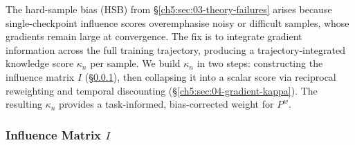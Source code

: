 \begin{foldable} %
	The hard-sample bias (HSB) from \S\ref{ch5:sec:03-theory-failures} arises because single-checkpoint influence scores overemphasise noisy or difficult samples, whose gradients remain large at convergence.
    The fix is to integrate gradient information across the full training trajectory, producing a trajectory-integrated knowledge score $\kappa_n$ per sample.
	We build $\kappa_n$ in two steps: constructing the influence matrix $I$ (\S\ref{ch5:sec:04-gradient-matrix}), then collapsing it into a scalar score via reciprocal reweighting and temporal discounting (\S\ref{ch5:sec:04-gradient-kappa}).
	The resulting $\kappa_n$ provides a task-informed, bias-corrected weight for $P^w$.
\end{foldable}

\subsubsection{Influence Matrix $I$} \label{ch5:sec:04-gradient-matrix}

